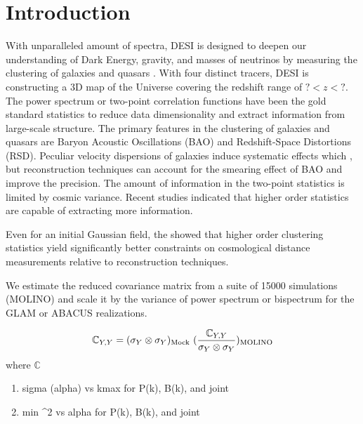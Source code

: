 \section{Introduction}
\label{sec:introduction}
With unparalleled amount of spectra, DESI is designed to deepen our understanding of Dark Energy, gravity, and masses of neutrinos by measuring the clustering of galaxies and quasars . With four distinct tracers, DESI is constructing a 3D map of the Universe covering the redshift range of $? < z < ?$. The power spectrum or two-point correlation functions have been the gold standard statistics to reduce data dimensionality and extract information from large-scale structure. The primary features in the clustering of galaxies and quasars are Baryon Acoustic Oscillations (BAO) and Redshift-Space Distortions (RSD). Peculiar velocity dispersions of galaxies induce systematic effects which , but reconstruction techniques can account for the smearing effect of BAO and improve the precision. The amount of information in the two-point statistics is limited by cosmic variance. Recent studies indicated that higher order statistics are capable of extracting more information.

Even for an initial Gaussian field, the \cite{samushia2021information} showed that higher order clustering statistics yield significantly better constraints on cosmological distance measurements relative to reconstruction techniques. 

We estimate the reduced covariance matrix from a suite of 15000 simulations (MOLINO) and scale it by the variance of power spectrum or bispectrum for the GLAM or ABACUS realizations.

\begin{equation}
	\mathbb{C}_{Y,Y} = (\sigma_{Y} \otimes \sigma_{Y})_{\rm Mock} ~ (\frac{\mathbb{C}_{Y,Y}}{\sigma_{Y} \otimes \sigma_{Y}})_{\rm MOLINO}
\end{equation}
where $\mathbb{C}$



\begin{enumerate}
\item sigma (alpha) vs kmax for P(k), B(k), and joint
\item min \chi^{2} vs alpha for P(k), B(k), and joint
\end{enumerate}

